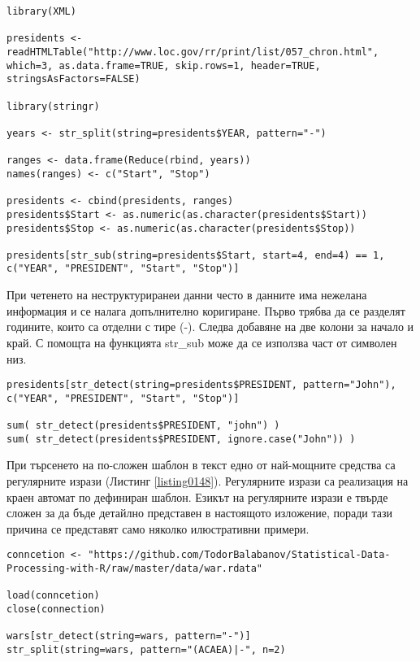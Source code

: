 \begin{lstlisting}[caption=Извличане на текст, label=listing0147]
library(XML)

presidents <- readHTMLTable("http://www.loc.gov/rr/print/list/057_chron.html", which=3, as.data.frame=TRUE, skip.rows=1, header=TRUE, stringsAsFactors=FALSE)

library(stringr)

years <- str_split(string=presidents$YEAR, pattern="-")

ranges <- data.frame(Reduce(rbind, years))
names(ranges) <- c("Start", "Stop")

presidents <- cbind(presidents, ranges)
presidents$Start <- as.numeric(as.character(presidents$Start))
presidents$Stop <- as.numeric(as.character(presidents$Stop))

presidents[str_sub(string=presidents$Start, start=4, end=4) == 1, c("YEAR", "PRESIDENT", "Start", "Stop")]
\end{lstlisting}

При четенето на неструктуриранеи данни често в данните има нежелана информация и се налага допълнително коригиране. Първо трябва да се разделят годините, които са отделни с тире (-). Следва добавяне на две колони за начало и край. С помощта на функцията str\_sub може да се използва част от символен низ. 

\begin{lstlisting}[caption=Регуларни изрази, label=listing0148]
presidents[str_detect(string=presidents$PRESIDENT, pattern="John"), c("YEAR", "PRESIDENT", "Start", "Stop")]

sum( str_detect(presidents$PRESIDENT, "john") )
sum( str_detect(presidents$PRESIDENT, ignore.case("John")) )
\end{lstlisting}

При търсенето на по-сложен шаблон в текст едно от най-мощните средства са регулярните изрази (Листинг \ref{listing0148}). Регулярните изрази са реализация на краен автомат по дефиниран шаблон. Езикът на регулярните изрази е твърде сложен за да бъде детайлно представен в настоящото изложение, поради тази причина се представят само няколко илюстративни примери. 

\begin{lstlisting}[caption=Сложни регуларни изрази, label=listing0149]
conncetion <- "https://github.com/TodorBalabanov/Statistical-Data-Processing-with-R/raw/master/data/war.rdata"

load(conncetion)
close(connection)

wars[str_detect(string=wars, pattern="-")]
str_split(string=wars, pattern="(ACAEA)|-", n=2)
\end{lstlisting}

